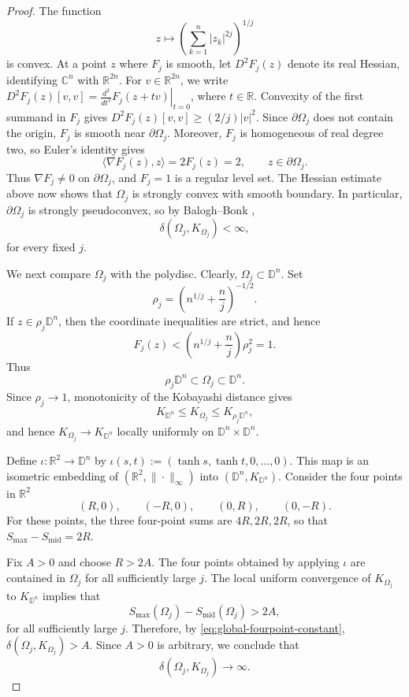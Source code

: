 \documentclass[11pt]{article}
\theoremstyle{definition}
\newcommand{\C}{\mathbb{C}}
\newcommand{\R}{\mathbb{R}}
\newcommand{\D}{\mathbb{D}}
\begin{document}
\begin{proof}
The function
\[
z\longmapsto
\left(\sum_{k=1}^n|z_k|^{2j}\right)^{1/j}
\]
is convex. At a point \(z\) where \(F_j\) is smooth, let
\(D^2F_j(z)\) denote its real Hessian, identifying
\(\C^n\) with \(\R^{2n}\). For \(v\in\R^{2n}\), we write
\(D^2F_j(z)[v,v]=\left.\frac{d^2}{dt^2}F_j(z+tv)\right|_{t=0}\),
where \(t\in\R\). Convexity of the first summand in \(F_j\) gives
\(D^2F_j(z)[v,v]\ge(2/j)|v|^2\).
Since \(\partial\Omega_j\) does not contain the origin, \(F_j\) is
smooth near \(\partial\Omega_j\).  Moreover, \(F_j\) is homogeneous of
real degree two, so Euler's identity gives
\[
\langle \nabla F_j(z),z\rangle=2F_j(z)=2,
\qquad z\in\partial\Omega_j.
\]
Thus \(\nabla F_j\ne0\) on \(\partial\Omega_j\), and \(F_j=1\) is a
regular level set.  The Hessian estimate above now shows that \(\Omega_j\)
is strongly convex with smooth boundary.  In particular,
\(\partial\Omega_j\) is strongly pseudoconvex, so by
Balogh--Bonk \cite{BaloghBonk},
\[
\delta(\Omega_j,K_{\Omega_j})<\infty,
\]
for every fixed \(j\).

We next compare \(\Omega_j\) with the polydisc.  Clearly,
\(
\Omega_j\subset\D^n.
\)
Set
\[
\rho_j
=
\left(n^{1/j}+\frac nj\right)^{-1/2}.
\]
If \(z\in\rho_j\D^n\), then the coordinate inequalities are strict, and
hence
\[
F_j(z)
<
\left(n^{1/j}+\frac nj\right)\rho_j^2
=1.
\]
Thus
\[
\rho_j\D^n\subset\Omega_j\subset\D^n.
\]
Since \(\rho_j\to1\), monotonicity of the Kobayashi distance gives
\[
K_{\D^n}\le K_{\Omega_j}\le K_{\rho_j\D^n},
\]
and hence
\(
K_{\Omega_j}\rightarrow K_{\D^n}
\)
locally uniformly on \(\D^n\times\D^n\).

Define \(\iota:\R^2\to\D^n\) by
\(\iota(s,t):=(\tanh s,\tanh t,0,\ldots,0)\).
This map is an isometric embedding of
\((\R^2,\|\cdot\|_\infty)\) into \((\D^n,K_{\D^n})\).
Consider the four points in
\(\R^2\)
\[
(R,0),\qquad
(-R,0),\qquad
(0,R),\qquad
(0,-R).
\]
For these points, the three four-point sums are
\(4R, 2R, 2R\),
so that
\(
S_{\max}-S_{\mathrm{mid}}=2R.
\)

Fix \(A>0\) and choose \(R>2A\).  The four points obtained by applying
\(\iota\) are contained in \(\Omega_j\) for all sufficiently large
\(j\).  The local uniform convergence of \(K_{\Omega_j}\) to
\(K_{\D^n}\) implies that
\[
S_{\max}(\Omega_j)-S_{\mathrm{mid}}(\Omega_j)>2A,
\]
for all sufficiently large \(j\).  Therefore,
by \eqref{eq:global-fourpoint-constant},
\(
\delta(\Omega_j,K_{\Omega_j})>A.
\)
Since \(A>0\) is arbitrary, we conclude that
\[
\delta(\Omega_j,K_{\Omega_j})\longrightarrow\infty.
\]
\end{proof}
\end{document}
